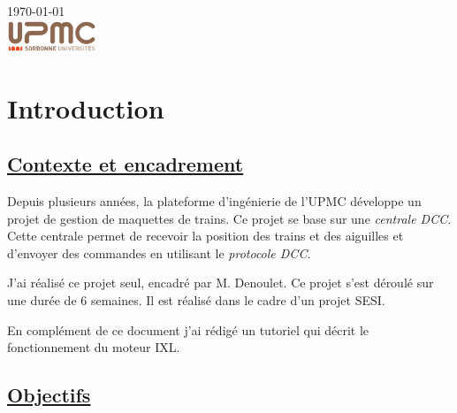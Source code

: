 \begin{titlepage}
{\large \today}\\[2cm] %


\includegraphics[width=0.2\textwidth]{logo.png}


\vfill %

\end{titlepage}




\section{Introduction}
\label{sec:introduction}

\subsection{\underline{Contexte et encadrement}}

Depuis plusieurs ann\'ees, la plateforme d'ingénierie de l'UPMC d\'eveloppe un projet de
gestion de maquettes de trains. Ce projet se base sur une
\emph{centrale DCC}. Cette centrale permet de recevoir la position des
trains et des aiguilles et d'envoyer des commandes en utilisant le
\emph{protocole DCC}.

J'ai r\'ealis\'e ce projet seul, encadr\'e par M. Denoulet. Ce projet s'est d\'eroulé sur une dur\'ee de 6 semaines.
Il est r\'ealis\'e dans le cadre d'un projet SESI.

En complément de ce document j'ai rédigé un tutoriel \cite{interface}
qui décrit le fonctionnement du moteur IXL.

\subsection{\underline{Objectifs}}

